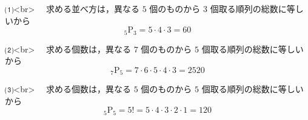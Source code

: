 ⑴<br>
　求める並べ方は，異なる $5$ 個のものから $3$ 個取る順列の総数に等しいから
$$
  _{5}\mathrm{P}_{3} = 5 \cdot 4 \cdot 3 = 60
$$

⑵<br>
　求める個数は，異なる $7$ 個のものから $5$ 個取る順列の総数に等しいから
$$
  _{7}\mathrm{P}_{5} = 7 \cdot 6 \cdot 5 \cdot 4 \cdot 3 = 2520
$$

⑶<br>
　求める個数は，異なる $5$ 個のものから $5$ 個取る順列の総数に等しいから
$$
  _{5}\mathrm{P}_{5} = 5! 
  = 5 \cdot 4 \cdot 3 \cdot 2 \cdot 1 = 120
$$
